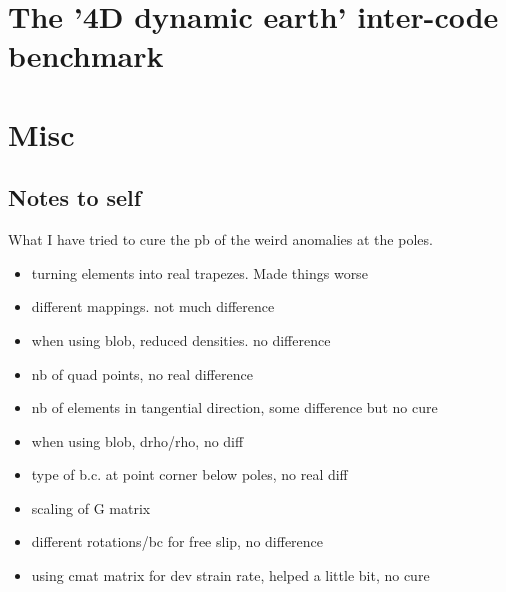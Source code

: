 \documentclass[a4paper]{article}
\begin{document}
\section{The '4D dynamic earth' inter-code benchmark}

\cite{krhb12}


\newpage
\appendix
\section{Misc}

\subsection{Notes to self}

What I have tried to cure the pb of the weird anomalies at the poles.

\begin{itemize}
\item turning elements into real trapezes. Made things worse
\item different mappings. not much difference
\item when using blob, reduced densities. no difference
\item nb of quad points, no real difference
\item nb of elements in tangential direction, some difference but no cure 
\item when using blob, drho/rho, no diff 
\item type of b.c. at point corner below poles, no real diff 
\item scaling of G matrix
\item different rotations/bc for free slip, no difference
\item using cmat matrix for dev strain rate, helped a little bit, no cure 
\end{itemize}



\end{document}
